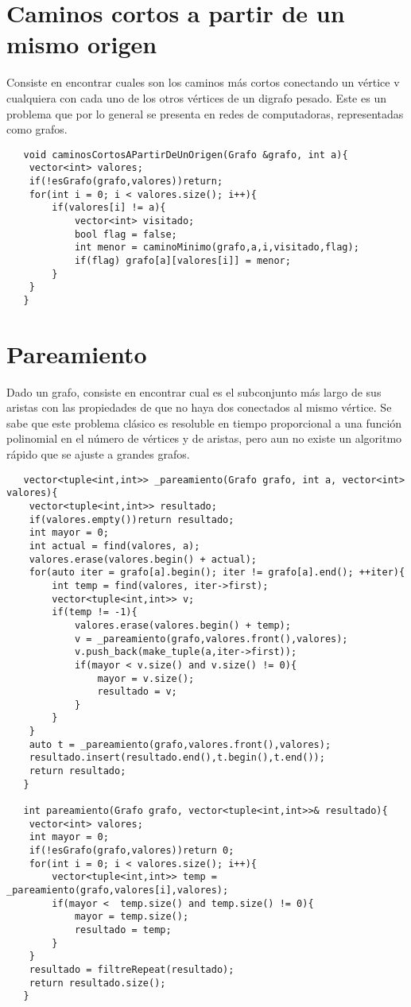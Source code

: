 \documentclass[a4paper,12pt]{article}
\begin{document}
  \section{Caminos cortos a partir de un mismo origen}
  Consiste en encontrar cuales son los caminos más cortos conectando un vértice 
  v cualquiera con cada uno de los otros vértices de un digrafo pesado. Este es un
  problema que por lo general se presenta en redes de computadoras, representadas como grafos.
  \begin{lstlisting}
   void caminosCortosAPartirDeUnOrigen(Grafo &grafo, int a){
    vector<int> valores;
    if(!esGrafo(grafo,valores))return;
    for(int i = 0; i < valores.size(); i++){
        if(valores[i] != a){
            vector<int> visitado;
            bool flag = false;
            int menor = caminoMinimo(grafo,a,i,visitado,flag);
            if(flag) grafo[a][valores[i]] = menor;
        }
    }
   }
  \end{lstlisting}
  \section{Pareamiento}
  Dado un grafo, consiste en encontrar cual es el subconjunto más largo de sus aristas
  con las propiedades de que no haya dos conectados al mismo vértice. Se sabe
  que este problema clásico es resoluble en tiempo proporcional a una función
  polinomial en el número de vértices y de aristas, pero aun no existe un algoritmo
  rápido que se ajuste a grandes grafos.
  \begin{lstlisting}
   vector<tuple<int,int>> _pareamiento(Grafo grafo, int a, vector<int> valores){
    vector<tuple<int,int>> resultado;
    if(valores.empty())return resultado;
    int mayor = 0;
    int actual = find(valores, a);
    valores.erase(valores.begin() + actual);
    for(auto iter = grafo[a].begin(); iter != grafo[a].end(); ++iter){
        int temp = find(valores, iter->first);
        vector<tuple<int,int>> v;
        if(temp != -1){
            valores.erase(valores.begin() + temp);
            v = _pareamiento(grafo,valores.front(),valores);
            v.push_back(make_tuple(a,iter->first));
            if(mayor < v.size() and v.size() != 0){
                mayor = v.size();
                resultado = v;
            }
        }
    }
    auto t = _pareamiento(grafo,valores.front(),valores);
    resultado.insert(resultado.end(),t.begin(),t.end());
    return resultado;
   }

   int pareamiento(Grafo grafo, vector<tuple<int,int>>& resultado){
    vector<int> valores;
    int mayor = 0;
    if(!esGrafo(grafo,valores))return 0;
    for(int i = 0; i < valores.size(); i++){
        vector<tuple<int,int>> temp = _pareamiento(grafo,valores[i],valores);
        if(mayor <  temp.size() and temp.size() != 0){
            mayor = temp.size();
            resultado = temp;
        }
    }
    resultado = filtreRepeat(resultado);
    return resultado.size();
   }
  \end{lstlisting}
\end{document}

